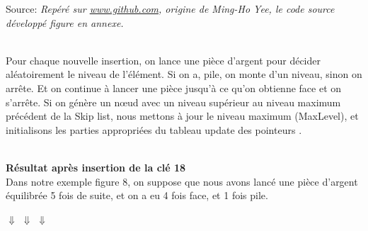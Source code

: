 \documentclass[hidelinks,a4paper,12pt]{article}
\begin{document}
\begin{center}
\caption*{ \small Source: \textit{Repéré sur  \href{https://github.com/mhyee/latex-examples/blob/master/skip_list.tex}{ www.github.com}, origine de Ming-Ho Yee, le code source développé figure en annexe.}}
\end{center}

~\\
Pour chaque nouvelle insertion, on lance une pièce d’argent pour décider aléatoirement le niveau de l’élément. Si on a, pile, on monte d’un niveau, sinon on arrête. Et on continue à lancer une pièce jusqu'à ce qu’on obtienne face et on s’arrête. Si on génère un nœud avec un niveau supérieur au niveau maximum précédent de la Skip list, nous mettons à jour le niveau maximum (MaxLevel), et initialisons les parties appropriées du tableau update des pointeurs \cite{ArticlePugh}.

~\\
\textbf {Résultat après insertion de la clé 18} \\
Dans notre exemple figure 8, on suppose que nous avons lancé une pièce d’argent équilibrée 5 fois de suite, et on a eu 4 fois face, et 1 fois pile. 

\begin{center}
	$\Downarrow$ $\Downarrow$ $\Downarrow$ 
\end{center}
\end{document}
